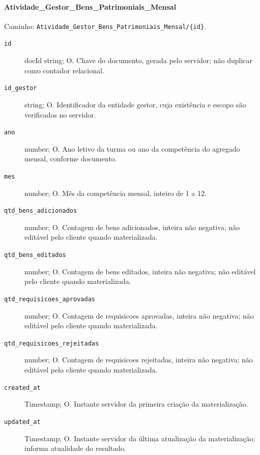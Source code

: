 \paragraph{Atividade\_Gestor\_Bens\_Patrimoniais\_Mensal}\mbox{}\par
Caminho: \texttt{Atividade\_Gestor\_Bens\_Patrimoniais\_Mensal/\{id\}}.
\begin{description}
\item[\texttt{id}] docId string; O. Chave do documento, gerada pelo servidor; não duplicar como contador relacional.
\item[\texttt{id\_gestor}] string; O. Identificador da entidade gestor, cuja existência e escopo são verificados no servidor.
\item[\texttt{ano}] number; O. Ano letivo da turma ou ano da competência do agregado mensal, conforme documento.
\item[\texttt{mes}] number; O. Mês da competência mensal, inteiro de 1 a 12.
\item[\texttt{qtd\_bens\_adicionados}] number; O. Contagem de bens adicionados, inteira não negativa; não editável pelo cliente quando materializada.
\item[\texttt{qtd\_bens\_editados}] number; O. Contagem de bens editados, inteira não negativa; não editável pelo cliente quando materializada.
\item[\texttt{qtd\_requisicoes\_aprovadas}] number; O. Contagem de requisicoes aprovadas, inteira não negativa; não editável pelo cliente quando materializada.
\item[\texttt{qtd\_requisicoes\_rejeitadas}] number; O. Contagem de requisicoes rejeitadas, inteira não negativa; não editável pelo cliente quando materializada.
\item[\texttt{created\_at}] Timestamp; O. Instante servidor da primeira criação da materialização.
\item[\texttt{updated\_at}] Timestamp; O. Instante servidor da última atualização da materialização; informa atualidade do resultado.
\end{description}

